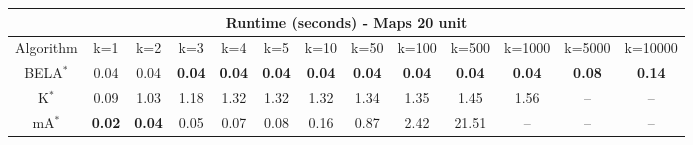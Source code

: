 \begin{tabular}{c|cccccccccccc}\toprule
\multicolumn{13}{c}{Runtime (seconds) - Maps 20 unit}\\ \midrule
Algorithm & k=1 & k=2 & k=3 & k=4 & k=5 & k=10 & k=50 & k=100 & k=500 & k=1000 & k=5000 & k=10000 \\ \midrule
BELA$^*$ & 0.04 & 0.04 & \textbf{0.04} & \textbf{0.04} & \textbf{0.04} & \textbf{0.04} & \textbf{0.04} & \textbf{0.04} & \textbf{0.04} & \textbf{0.04} & \textbf{0.08} & \textbf{0.14} \\
K$^*$ & 0.09 & 1.03 & 1.18 & 1.32 & 1.32 & 1.32 & 1.34 & 1.35 & 1.45 & 1.56 & -- & -- \\
mA$^*$ & \textbf{0.02} & \textbf{0.04} & 0.05 & 0.07 & 0.08 & 0.16 & 0.87 & 2.42 & 21.51 & -- & -- & -- \\ \bottomrule 
\end{tabular}
